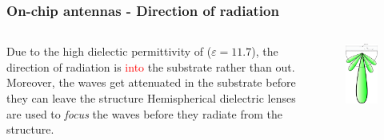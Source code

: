 \documentclass[10pt]{beamer}
\newcommand{\E}{\varepsilon}  %
\begin{document}
\begin{frame}
    \frametitle{On-chip antennas - Direction of radiation}
    \begin{columns}[T]
        \begin{column}{.5\textwidth}
            \begin{outline}
                \1 Due to the high dielectic permittivity of  ($\E = 11.7$), the direction of radiation is \textcolor{red}{into} the substrate rather than out.
                \1 Moreover, the waves get attenuated in the substrate before they can leave the structure
                \1 Hemispherical dielectric lenses are used to \textit{focus} the waves before they radiate from the structure.
            \end{outline}
        \end{column}
        \begin{column}{.5\textwidth}
            \begin{figure}[T!]
                \centering
                \includegraphics[width=.55\textwidth]{lens_onchipantennas.pdf}
                \label{fig:lens_on_chip}
            \end{figure}
        \end{column}
    \end{columns}
\end{frame}
\end{document}
